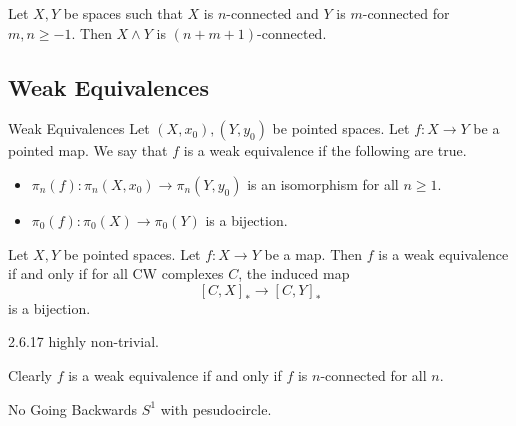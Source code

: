 \documentclass[a4paper]{article}
\begin{document}
\begin{prp}{}{} Let $X,Y$ be spaces such that $X$ is $n$-connected and $Y$ is $m$-connected for $m,n\geq -1$. Then $X\wedge Y$ is $(n+m+1)$-connected. 
\end{prp}

\subsection{Weak Equivalences}
\begin{defn}{Weak Equivalences}{} Let $(X,x_0),(Y,y_0)$ be pointed spaces. Let $f:X\to Y$ be a pointed map. We say that $f$ is a weak equivalence if the following are true. 
\begin{itemize}
\item $\pi_n(f):\pi_n(X,x_0)\to\pi_n(Y,y_0)$ is an isomorphism for all $n\geq 1$. 
\item $\pi_0(f):\pi_0(X)\to\pi_0(Y)$ is a bijection. 
\end{itemize}
\end{defn}

\begin{prp}{}{} Let $X,Y$ be pointed spaces. Let $f:X\to Y$ be a map. Then $f$ is a weak equivalence if and only if for all CW complexes $C$, the induced map $$[C,X]_\ast\to[C,Y]_\ast$$ is a bijection. 
\end{prp}

2.6.17 highly non-trivial. 

Clearly $f$ is a weak equivalence if and only if $f$ is $n$-connected for all $n$. 

\begin{eg}{No Going Backwards}{} $S^1$ with pesudocircle. 
\end{eg}
\end{document}
